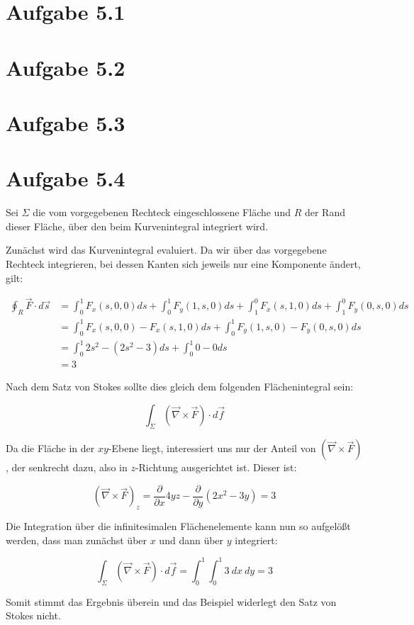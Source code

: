 \documentclass{theozettel}
\begin{document}

\section*{Aufgabe 5.1}




\section*{Aufgabe 5.2}




\section*{Aufgabe 5.3}




\section*{Aufgabe 5.4}

Sei $\Sigma$ die vom vorgegebenen Rechteck eingeschlossene Fläche und $R$ der Rand dieser Fläche, über den beim Kurvenintegral integriert wird.

Zunächst wird das Kurvenintegral evaluiert. Da wir über das vorgegebene Rechteck integrieren, bei dessen Kanten sich jeweils nur eine Komponente ändert, gilt:

\begin{align}
\oint_R \vec{F} \cdot d \vec{s} &= \int_0^{1} F_x(s,0,0) ds + \int_0^{1} F_y(1,s,0) ds + \int_1^{0} F_x(s,1,0) ds + \int_1^{0} F_y(0,s,0) ds \\
&= \int_0^{1} F_x(s,0,0) - F_x(s,1,0) ds + \int_0^{1} F_y(1,s,0) - F_y(0,s,0) ds \\
&=  \int_0^{1} 2s^{2} - (2s^{2} - 3) ds + \int_0^{1} 0-0 ds \\
&= 3
\end{align}

Nach dem Satz von Stokes sollte dies gleich dem folgenden Flächenintegral sein:

$$
\int_\Sigma (\vec{\nabla} \times \vec{F}) \cdot d \vec{f}
$$

Da die Fläche in der $xy$-Ebene liegt, interessiert uns nur der Anteil von $(\vec{\nabla} \times \vec{F})$, der senkrecht dazu, also in $z$-Richtung ausgerichtet ist. Dieser ist:

$$
(\vec{\nabla} \times \vec{F})_z = \frac{\partial}{\partial x} 4yz - \frac{\partial}{\partial y} (2x^{2} - 3y) = 3
$$

Die Integration über die infinitesimalen Flächenelemente kann nun so aufgelößt werden, dass man zunächst über $x$ und dann über $y$ integriert:

$$
\int_\Sigma (\vec{\nabla} \times \vec{F}) \cdot d \vec{f} = \int_0^{1}  \int_0^{1} 3\ dx\ dy = 3
$$

Somit stimmt das Ergebnis überein und das Beispiel widerlegt den Satz von Stokes nicht.
\end{document}
